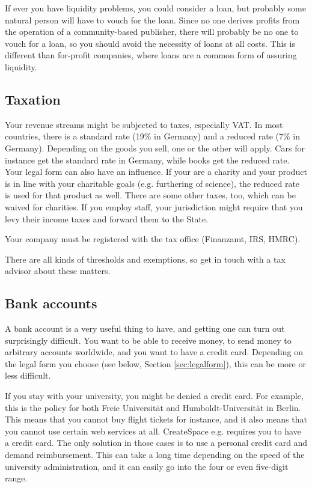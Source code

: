 \documentclass[nonflat,modfonts,output=book] {langsci/langscibook}
\begin{document}
If ever you have liquidity problems, you could consider a loan, but probably some natural person will have to vouch for the loan. Since no one derives profits from the operation of a community-based publisher, there will probably be no one to vouch for a loan, so you should avoid the necessity of loans at all costs. This is different than for-profit companies, where loans are a common form of assuring liquidity. 
   
\subsection{Taxation}
Your revenue streams might be subjected to taxes, especially VAT. In most countries, there is a standard rate (19\% in Germany) and a reduced rate (7\% in Germany). Depending on the goods you sell, one or the other will apply. Cars for instance get the standard rate in Germany, while books get the reduced rate. Your legal form can also have an influence. If your are a charity and your product is in line with your charitable goals (e.g. furthering of science), the reduced rate is used for that product as well. There are some other taxes, too, which can be waived for charities. If you employ staff, your jurisdiction might require that you levy their income taxes and forward them to the State.

Your company must be registered with the tax office (Finanzamt, IRS, HMRC).

There are all kinds of thresholds and exemptions, so get in touch with a tax advisor about these matters. 

\subsection{Bank accounts}
A bank account is a very useful thing to have, and getting one can turn out surprisingly difficult. You want to be able to receive money, to send money to arbitrary accounts worldwide, and you want to have a credit card. Depending on the legal form you choose (see below, Section \ref{sec:legalform}), this can be more or less difficult. 

If you stay with your university, you might be denied a credit card. For example, this is the policy for both Freie Universität and Humboldt-Universität in Berlin. This means that you cannot buy flight tickets for instance, and it also means that you cannot use certain web services at all. CreateSpace e.g. requires you to have a credit card. The only solution in those cases is to use a personal credit card and demand reimbursement. This can take a long time depending on the speed of the university administration, and it can easily go into the four or even five-digit range. 
\end{document}
